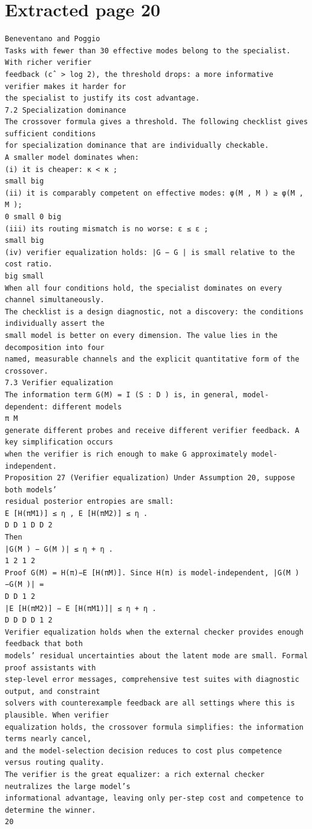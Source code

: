 \documentclass[11pt]{article}
\begin{document}
\clearpage
\section*{Extracted page 20}
\begin{verbatim}
Beneventano and Poggio
Tasks with fewer than 30 effective modes belong to the specialist. With richer verifier
feedback (cˆ > log 2), the threshold drops: a more informative verifier makes it harder for
the specialist to justify its cost advantage.
7.2 Specialization dominance
The crossover formula gives a threshold. The following checklist gives sufficient conditions
for specialization dominance that are individually checkable.
A smaller model dominates when:
(i) it is cheaper: κ < κ ;
small big
(ii) it is comparably competent on effective modes: φ(M , M ) ≥ φ(M , M );
0 small 0 big
(iii) its routing mismatch is no worse: ε ≤ ε ;
small big
(iv) verifier equalization holds: |G − G | is small relative to the cost ratio.
big small
When all four conditions hold, the specialist dominates on every channel simultaneously.
The checklist is a design diagnostic, not a discovery: the conditions individually assert the
small model is better on every dimension. The value lies in the decomposition into four
named, measurable channels and the explicit quantitative form of the crossover.
7.3 Verifier equalization
The information term G(M) = I (S : D ) is, in general, model-dependent: different models
π M
generate different probes and receive different verifier feedback. A key simplification occurs
when the verifier is rich enough to make G approximately model-independent.
Proposition 27 (Verifier equalization) Under Assumption 20, suppose both models’
residual posterior entropies are small:
E [H(πM1)] ≤ η , E [H(πM2)] ≤ η .
D D 1 D D 2
Then
|G(M ) − G(M )| ≤ η + η .
1 2 1 2
Proof G(M) = H(π)−E [H(πM)]. Since H(π) is model-independent, |G(M )−G(M )| =
D D 1 2
|E [H(πM2)] − E [H(πM1)]| ≤ η + η .
D D D D 1 2
Verifier equalization holds when the external checker provides enough feedback that both
models’ residual uncertainties about the latent mode are small. Formal proof assistants with
step-level error messages, comprehensive test suites with diagnostic output, and constraint
solvers with counterexample feedback are all settings where this is plausible. When verifier
equalization holds, the crossover formula simplifies: the information terms nearly cancel,
and the model-selection decision reduces to cost plus competence versus routing quality.
The verifier is the great equalizer: a rich external checker neutralizes the large model’s
informational advantage, leaving only per-step cost and competence to determine the winner.
20
\end{verbatim}
\end{document}
